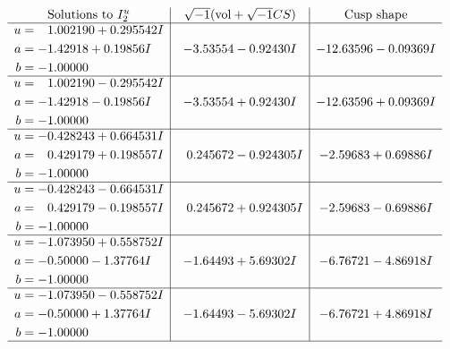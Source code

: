 \documentclass[1p]{elsarticle_modified}
\theoremstyle{definition}
\newcommand{\I}{\sqrt{-1}}
\begin{document}
$$\begin{array}{c|c|c}  
\text{Solutions to }I^u_{2}& \I (\text{vol} + \sqrt{-1}CS) & \text{Cusp shape}\\
 \hline 
\begin{aligned}
u &= \phantom{-}1.002190 + 0.295542 I \\
a &= -1.42918 + 0.19856 I \\
b &= -1.00000\phantom{ +0.000000I}\end{aligned}
 & -3.53554 - 0.92430 I & -12.63596 - 0.09369 I \\ \hline\begin{aligned}
u &= \phantom{-}1.002190 - 0.295542 I \\
a &= -1.42918 - 0.19856 I \\
b &= -1.00000\phantom{ +0.000000I}\end{aligned}
 & -3.53554 + 0.92430 I & -12.63596 + 0.09369 I \\ \hline\begin{aligned}
u &= -0.428243 + 0.664531 I \\
a &= \phantom{-}0.429179 + 0.198557 I \\
b &= -1.00000\phantom{ +0.000000I}\end{aligned}
 & \phantom{-}0.245672 - 0.924305 I & -2.59683 + 0.69886 I \\ \hline\begin{aligned}
u &= -0.428243 - 0.664531 I \\
a &= \phantom{-}0.429179 - 0.198557 I \\
b &= -1.00000\phantom{ +0.000000I}\end{aligned}
 & \phantom{-}0.245672 + 0.924305 I & -2.59683 - 0.69886 I \\ \hline\begin{aligned}
u &= -1.073950 + 0.558752 I \\
a &= -0.50000 - 1.37764 I \\
b &= -1.00000\phantom{ +0.000000I}\end{aligned}
 & -1.64493 + 5.69302 I & -6.76721 - 4.86918 I \\ \hline\begin{aligned}
u &= -1.073950 - 0.558752 I \\
a &= -0.50000 + 1.37764 I \\
b &= -1.00000\phantom{ +0.000000I}\end{aligned}
 & -1.64493 - 5.69302 I & -6.76721 + 4.86918 I\\
 \hline 
 \end{array}$$\newpage
\end{document}
